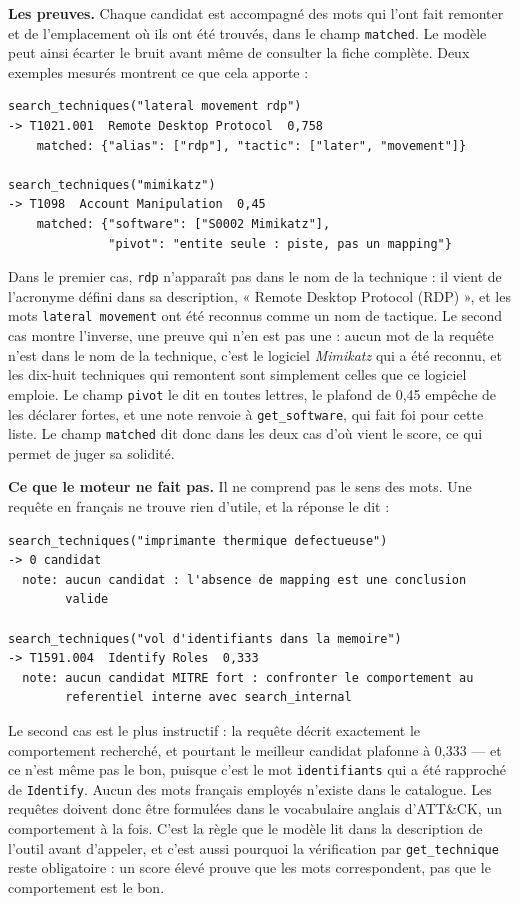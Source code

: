 \textbf{Les preuves.} Chaque candidat est accompagné des mots qui l'ont fait remonter et de l'emplacement où ils ont été trouvés, dans le champ \texttt{matched}. Le modèle peut ainsi écarter le bruit avant même de consulter la fiche complète. Deux exemples mesurés montrent ce que cela apporte :

\begin{verbatim}
search_techniques("lateral movement rdp")
-> T1021.001  Remote Desktop Protocol  0,758
    matched: {"alias": ["rdp"], "tactic": ["later", "movement"]}

search_techniques("mimikatz")
-> T1098  Account Manipulation  0,45
    matched: {"software": ["S0002 Mimikatz"],
              "pivot": "entite seule : piste, pas un mapping"}
\end{verbatim}

Dans le premier cas, \texttt{rdp} n'apparaît pas dans le nom de la technique : il vient de l'acronyme défini dans sa description, « Remote Desktop Protocol (RDP) », et les mots \texttt{lateral\ movement} ont été reconnus comme un nom de tactique. Le second cas montre l'inverse, une preuve qui n'en est pas une : aucun mot de la requête n'est dans le nom de la technique, c'est le logiciel \emph{Mimikatz} qui a été reconnu, et les dix-huit techniques qui remontent sont simplement celles que ce logiciel emploie. Le champ \texttt{pivot} le dit en toutes lettres, le plafond de 0,45 empêche de les déclarer fortes, et une note renvoie à \texttt{get\_software}, qui fait foi pour cette liste. Le champ \texttt{matched} dit donc dans les deux cas d'où vient le score, ce qui permet de juger sa solidité.

\textbf{Ce que le moteur ne fait pas.} Il ne comprend pas le sens des mots. Une requête en français ne trouve rien d'utile, et la réponse le dit :

\begin{verbatim}
search_techniques("imprimante thermique defectueuse")
-> 0 candidat
  note: aucun candidat : l'absence de mapping est une conclusion
        valide

search_techniques("vol d'identifiants dans la memoire")
-> T1591.004  Identify Roles  0,333
  note: aucun candidat MITRE fort : confronter le comportement au
        referentiel interne avec search_internal
\end{verbatim}

Le second cas est le plus instructif : la requête décrit exactement le comportement recherché, et pourtant le meilleur candidat plafonne à 0,333 --- et ce n'est même pas le bon, puisque c'est le mot \texttt{identifiants} qui a été rapproché de \texttt{Identify}. Aucun des mots français employés n'existe dans le catalogue. Les requêtes doivent donc être formulées dans le vocabulaire anglais d'ATT\&CK, un comportement à la fois. C'est la règle que le modèle lit dans la description de l'outil avant d'appeler, et c'est aussi pourquoi la vérification par \texttt{get\_technique} reste obligatoire : un score élevé prouve que les mots correspondent, pas que le comportement est le bon.

